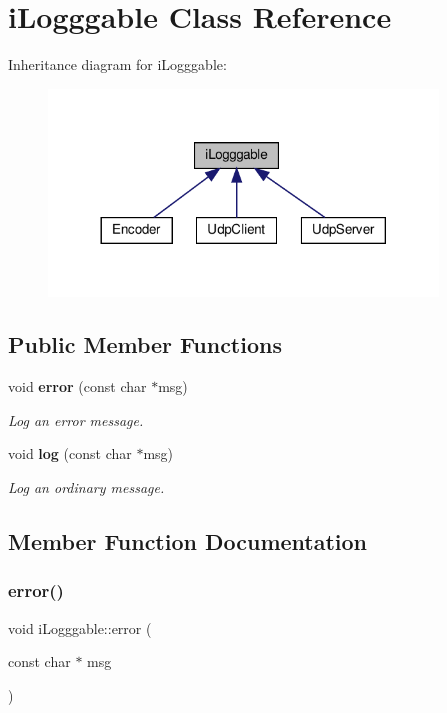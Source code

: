 \section{i\+Logggable Class Reference}
\label{classi_logggable}


Inheritance diagram for i\+Logggable\+:\nopagebreak
\begin{figure}[H]
\begin{center}
\leavevmode
\includegraphics[width=293pt]{classi_logggable__inherit__graph}
\end{center}
\end{figure}
\subsection*{Public Member Functions}
\begin{DoxyCompactItemize}
\item 
void \textbf{ error} (const char $\ast$msg)
\begin{DoxyCompactList}\small\item\em Log an error message. \end{DoxyCompactList}\item 
void \textbf{ log} (const char $\ast$msg)
\begin{DoxyCompactList}\small\item\em Log an ordinary message. \end{DoxyCompactList}\end{DoxyCompactItemize}


\subsection{Member Function Documentation}
\mbox{\label{classi_logggable_ae7bda22bccfb292f6d9be01d3b5aaeaf}} 
\subsubsection{error()}
{\footnotesize\ttfamily void i\+Logggable\+::error (\begin{DoxyParamCaption}\item[{const char $\ast$}]{msg }\end{DoxyParamCaption})\hspace{0.3cm}{\ttfamily [inline]}}




